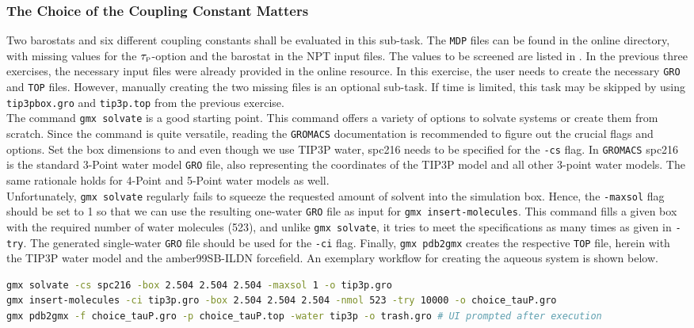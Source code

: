 \documentclass[9pt,tutorial]{livecoms}
\newcommand{\code}[1]{\colorbox{light-gray}{\texttt{#1}}}
\begin{document}
\subsubsection*{The Choice of the Coupling Constant Matters}
Two barostats and six different coupling constants shall be evaluated in this sub-task. The \texttt{MDP} files can be found in the online directory, with missing values for the $\tau_\text{\tiny P}$-option and the barostat in the NPT input files. The values to be screened are listed in . In the previous three exercises, the necessary input files were already provided in the online resource. In this exercise, the user needs to create the necessary \texttt{GRO} and \texttt{TOP} files. However, manually creating the two missing files is an optional sub-task. If time is limited, this task may be skipped by using \texttt{tip3pbox.gro} and \texttt{tip3p.top} from the previous exercise.\\
The command \code{gmx solvate} is a good starting point. This command offers a variety of options to solvate systems or create them from scratch. Since the command is quite versatile, reading the \texttt{GROMACS} documentation is recommended to figure out the crucial flags and options. Set the box dimensions to  and even though we use TIP3P water, spc216 needs to be specified for the \code{-cs} flag. In \texttt{GROMACS} spc216 is the standard 3-Point water model \texttt{GRO} file, also representing the coordinates of the TIP3P model and all other 3-point water models. The same rationale holds for 4-Point and 5-Point water models as well.\\
Unfortunately, \code{gmx solvate} regularly fails to squeeze the requested amount of solvent into the simulation box. Hence, the \code{-maxsol} flag should be set to \num{1} so that we can use the resulting one-water \texttt{GRO} file as input for \code{gmx insert-molecules}. This command fills a given box with the required number of water molecules (\num{523}), and unlike \code{gmx solvate}, it tries to meet the specifications as many times as given in \code{-try}. The generated single-water \texttt{GRO} file should be used for the \code{-ci} flag. Finally, \code{gmx pdb2gmx} creates the respective \texttt{TOP} file, herein with the TIP3P water model and the amber99SB-ILDN forcefield. An exemplary workflow for creating the aqueous system is shown below.\\
\begin{lstlisting}[language=bash]
gmx solvate -cs spc216 -box 2.504 2.504 2.504 -maxsol 1 -o tip3p.gro
gmx insert-molecules -ci tip3p.gro -box 2.504 2.504 2.504 -nmol 523 -try 10000 -o choice_tauP.gro
gmx pdb2gmx -f choice_tauP.gro -p choice_tauP.top -water tip3p -o trash.gro # UI prompted after execution
\end{lstlisting}
\end{document}
